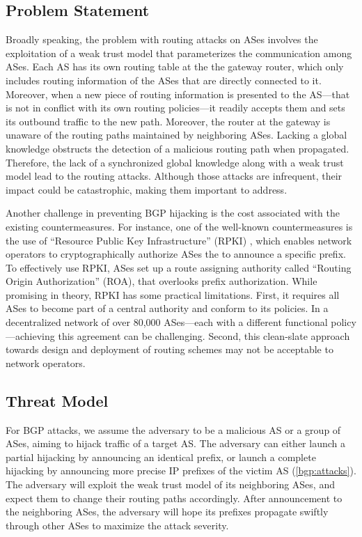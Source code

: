 \documentclass[5p]{elsarticle}
\begin{document}
\subsection{Problem Statement} \label{sec:psn}
Broadly speaking, the problem with routing attacks on ASes involves the exploitation of a weak trust model that parameterizes the communication among ASes. Each AS has its own routing table at the the gateway router, which only includes routing information of the ASes that are directly connected to it. Moreover, when a new  piece of routing information is presented to the AS---that is not in conflict with its own routing policies---it readily accepts them and sets its outbound traffic to the new path. Moreover, the router at the gateway is unaware of the routing paths maintained by neighboring ASes. Lacking a global knowledge obstructs the detection of a malicious routing path when propagated. Therefore, the lack of a synchronized global knowledge along with a weak trust model lead to the routing attacks. Although those attacks are infrequent, their impact could be catastrophic, making them important to address. 

Another challenge in preventing BGP hijacking is the cost associated with the existing countermeasures. For instance, one of the well-known countermeasures is the use of ``Resource Public Key Infrastructure'' (RPKI) \cite{rfc8481}, which enables network operators to cryptographically authorize ASes the to announce a specific prefix. To effectively use RPKI, ASes set up a route assigning authority called ``Routing Origin Authorization'' (ROA), that overlooks prefix authorization. While promising in theory, RPKI has some practical limitations. First, it requires all ASes to become part of a central authority and conform to its policies. In a decentralized network of over 80,000 ASes---each with a different functional policy---achieving this agreement can be challenging. Second, this clean-slate approach towards design and deployment of routing schemes may not be acceptable to network operators. 

\subsection{Threat Model} \label{sec:tm}
For BGP attacks, we assume the adversary to be a malicious AS or a group of ASes, aiming to hijack traffic of a target AS. The adversary can either launch a partial hijacking by announcing an identical prefix, or launch a complete hijacking by announcing more precise IP prefixes of the victim AS (\textsection\ref{bgp:attacks}). The adversary will exploit the weak trust model of its neighboring ASes, and expect them to change their routing paths accordingly. After announcement to the neighboring ASes, the adversary will hope its prefixes propagate swiftly through other ASes to maximize the attack severity. 
\end{document}
